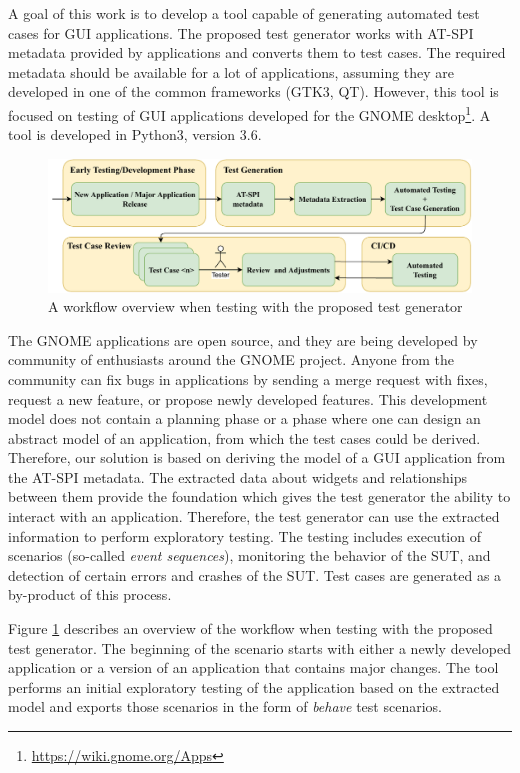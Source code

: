 A goal of this work is to develop a tool capable of generating automated test cases for GUI applications. The proposed test generator works with AT-SPI metadata provided by applications and converts them to test cases. The required metadata should be available for a lot of applications, assuming they are developed in one of the common frameworks (GTK3, QT). However, this tool is focused on testing of GUI applications developed for the GNOME desktop\footnote{\url{https://wiki.gnome.org/Apps}}. A tool is developed in Python3, version 3.6.

\begin{figure}[hbt!]
	\centering
	\includegraphics[width=1\textwidth]{obrazky-figures/overview.pdf}
	\caption{A workflow overview when testing with the proposed test generator}
	\label{Diagram}
\end{figure}

The GNOME applications are open source, and they are being developed by community of enthusiasts around the GNOME project. Anyone from the community can fix bugs in applications by sending a merge request with fixes, request a new feature, or propose newly developed features. This development model does not contain a planning phase or a phase where one can design an abstract model of an application, from which the test cases could be derived. Therefore, our solution is based on deriving the model of a GUI application from the AT-SPI metadata. The extracted data about widgets and relationships between them provide the foundation which gives the test generator the ability to interact with an application. Therefore, the test generator can use the extracted information to perform exploratory testing. The testing includes execution of scenarios (so-called \textit{event sequences}), monitoring the behavior of the SUT, and detection of certain errors and crashes of the SUT. Test cases are generated as a by-product of this process.


Figure \ref{Diagram} describes an overview of the workflow when testing with the proposed test generator. The beginning of the scenario starts with either a newly developed application or a version of an application that contains major changes. The tool performs an  initial exploratory testing of the application based on the extracted model and exports those scenarios in the form of \textit{behave} test scenarios.

